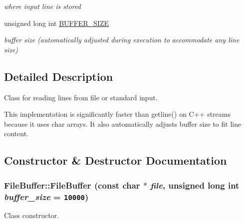 \begin{CompactItemize}
\begin{CompactList}\small\item\em where input line is stored \item\end{CompactList}\item 
\hypertarget{classFileBuffer_73d2b90a38cc6e8326fbc03b7ff244ef}{
unsigned long int \hyperlink{classFileBuffer_73d2b90a38cc6e8326fbc03b7ff244ef}{BUFFER\_\-SIZE}}
\label{classFileBuffer_73d2b90a38cc6e8326fbc03b7ff244ef}

\begin{CompactList}\small\item\em buffer size (automatically adjusted during execution to accommodate any line size) \item\end{CompactList}\end{CompactItemize}


\subsection{Detailed Description}
Class for reading lines from file or standard input. 

This implementation is significantly faster than getline() on C++ streams because it uses char arrays. It also automatically adjusts buffer size to fit line content. 

\subsection{Constructor \& Destructor Documentation}
\hypertarget{classFileBuffer_8dfee67d26ddebb474edd7676f4bdf3d}{
\subsubsection[FileBuffer]{\setlength{\rightskip}{0pt plus 5cm}FileBuffer::FileBuffer (const char $\ast$ {\em file}, \/  unsigned long int {\em buffer\_\-size} = {\tt 10000})}}
\label{classFileBuffer_8dfee67d26ddebb474edd7676f4bdf3d}


Class constructor. 

